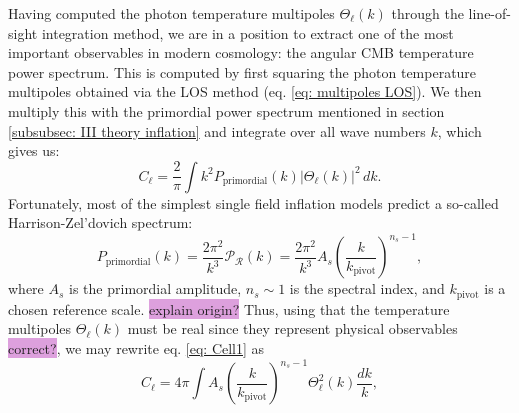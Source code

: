 \documentclass{aa}
\numberwithin{equation}{section}
\numberwithin{table}{section}
\numberwithin{figure}{section}
\begin{document}
Having computed the photon temperature multipoles $\Theta_\ell(k)$ through the line-of-sight integration method, we are in a position to extract one of the most important observables in modern cosmology: the angular CMB temperature power spectrum. 
This is computed by first squaring the photon temperature multipoles obtained via the LOS method (eq. \eqref{eq: multipoles LOS}). We then multiply this with the primordial power spectrum mentioned in section \ref{subsubsec: III theory inflation} and integrate over all wave numbers $k$, which gives us:
\begin{equation}
    C_\ell = \frac{2}{\pi} \int k^2 P_\text{primordial}(k) \left| \Theta_\ell(k) \right|^2 \, dk. \label{eq: Cell1}
\end{equation}
Fortunately, most of the simplest single field inflation models predict a so-called Harrison-Zel'dovich spectrum:
\begin{equation}
  P_\text{primordial}(k) = \frac{2\pi^2}{k^3}\mathcal{P}_{\mathcal{R}}(k) = \frac{2\pi^2}{k^3}A_s \left( \frac{k}{k_\text{pivot}} \right)^{n_s - 1},
\end{equation}
where $A_s$ is the primordial amplitude, $n_s\sim1$ is the spectral index, and $k_\text{pivot}$ is a chosen reference scale. \colorbox{Plum}{explain origin?} Thus, using that the temperature multipoles $\Theta_\ell(k)$ must be real since they represent physical observables \colorbox{Plum}{correct?}, we may rewrite eq. \eqref{eq: Cell1} as
\begin{equation}
  C_\ell = 4\pi \int  A_s\left( \frac{k}{k_\text{pivot}} \right)^{n_s - 1} \Theta^2_\ell(k) \frac{dk}{k}, \label{eq: Cell2}
\end{equation}

\end{document}
